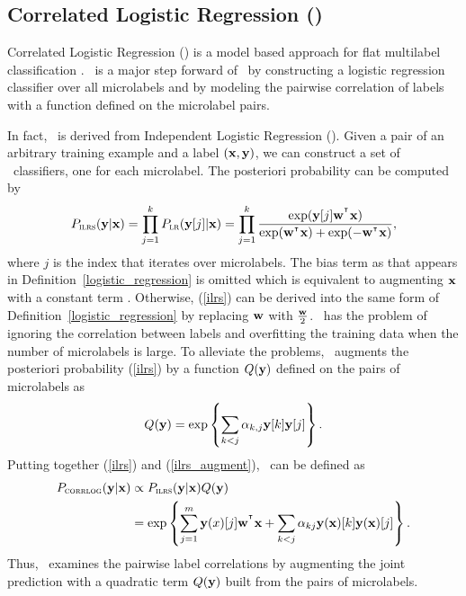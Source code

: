 {%
%
\subsection{Correlated Logistic Regression (\corrlog)} \label{sc_corrlog}

Correlated Logistic Regression (\corrlog) is a model based approach for flat multilabel classification \citep{Bian12corrlog}.
\corrlog\ is a major step forward of \iblr\ by constructing a logistic regression classifier over all microlabels and by modeling the pairwise correlation of labels with a function defined on the microlabel pairs.

In fact, \corrlog\ is derived from Independent Logistic Regression (\ilrs). 
Given a pair of an arbitrary training example and a label $(\mathbf {x},\mathbf {y})$, we can construct a set of \ilrs\ classifiers, one for each microlabel.
The posteriori probability can be computed by
\begin{align}
	P_{\text{{\sc ilrs}}}(\mathbf {y}|\mathbf {x}) 
	= \prod_{j=1}^{k}P_{\text{{\sc lr}}}(\mathbf {y}[j]|\mathbf {x})
	= \prod_{j=1}^{k}\frac{\exp(\mathbf {y}[j]\mathbf {w}^{^{\intercal}}\mathbf {x})}{\exp(\mathbf {w}^{^{\intercal}}\mathbf {x})+\exp(-\mathbf {w}^{^{\intercal}}\mathbf {x})}, \label{ilrs}
\end{align}
where $j$ is the index that iterates over microlabels. 
The bias term as that appears in Definition~\ref{logistic_regression} is omitted which is equivalent to augmenting $\mathbf {x}$ with a constant term \citep{Bian12corrlog}.
Otherwise, (\ref{ilrs}) can be derived into the same form of Definition~\ref{logistic_regression} by replacing $\mathbf {w}$ with $\frac{\mathbf {w}}{2}$.
\ilrs\ has the problem of ignoring the correlation between labels and overfitting the training data when the number of microlabels is large.
To alleviate the problems, \corrlog\ augments the posteriori probability (\ref{ilrs}) by a function $Q(\mathbf {y})$ defined on the pairs of microlabels as
\begin{align}
	Q(\mathbf {y}) = \exp\left\{\sum_{k<j}\alpha_{k,j}\mathbf {y}[k]\mathbf {y}[j]\right\}. \label{ilrs_augment}
\end{align}
Putting together (\ref{ilrs}) and (\ref{ilrs_augment}), \corrlog\ can be defined as
\begin{align*}
	P_{\text{{\sc corrlog}}}(\mathbf {y}|\mathbf {x}) &\propto P_{\text{{\sc ilrs}}}(\mathbf {y}|\mathbf {x}) Q(\mathbf {y}) \\
		&=\exp\left\{ \sum_{j=1}^{m}\mathbf {y}(x)[j]\mathbf {w}^{^{\intercal}}\mathbf {x} + \sum_{k<j}\alpha_{kj}\mathbf {y}(\mathbf {x})[k]\mathbf {y}(\mathbf {x})[j] \right\}.
\end{align*}
Thus, \corrlog\ examines the pairwise label correlations by augmenting the joint prediction with a quadratic term $Q(\mathbf {y})$ built from the pairs of microlabels.



}
